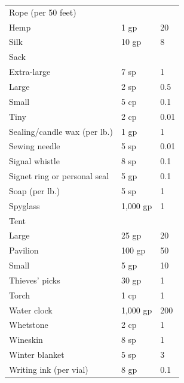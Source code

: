 \begin{multicols}{2}
\begin{minipage}{\columnwidth}
\begin{tabular}{|p{}|p{}|p{}|}
Rope (per 50 feet)	& 	& \\
\hspace{1em}Hemp				& 1 gp	& 20 \\
\rowcolor[gray]{.9}\hspace{1em}Silk				& 10 gp	& 8 \\
Sack				& 	& \\
\hspace{1em}Extra-large		& 7 sp	& 1 \\
\rowcolor[gray]{.9}\hspace{1em}Large				& 2 sp	& 0.5 \\
\hspace{1em}Small				& 5 cp	& 0.1 \\
\rowcolor[gray]{.9}\hspace{1em}Tiny				& 2 cp	& 0.01 \\
Sealing/candle wax (per lb.)	& 1 gp	& 1 \\
\rowcolor[gray]{.9}Sewing needle		& 5 sp	& 0.01 \\
Signal whistle		& 8 sp	& 0.1 \\
\rowcolor[gray]{.9}Signet ring or personal seal	& 5 gp	& 0.1 \\
Soap (per lb.)		& 5 sp	& 1 \\
\rowcolor[gray]{.9}Spyglass			& 1,000 gp	& 1 \\
Tent				& 	& \\
\hspace{1em}Large				& 25 gp	& 20 \\
\rowcolor[gray]{.9}\hspace{1em}Pavilion			& 100 gp	& 50 \\
\hspace{1em}Small				& 5 gp	& 10 \\
\rowcolor[gray]{.9}Thieves' picks		& 30 gp	& 1 \\
Torch				& 1 cp	& 1 \\
\rowcolor[gray]{.9}Water clock			& 1,000 gp	& 200 \\
Whetstone			& 2 cp	& 1 \\
\rowcolor[gray]{.9}Wineskin			& 8 sp	& 1 \\
Winter blanket		& 5 sp	& 3 \\
\rowcolor[gray]{.9}Writing ink (per vial)	& 8 gp	& 0.1 \\
\hline
\end{tabular}

\end{minipage}


\end{multicols}
